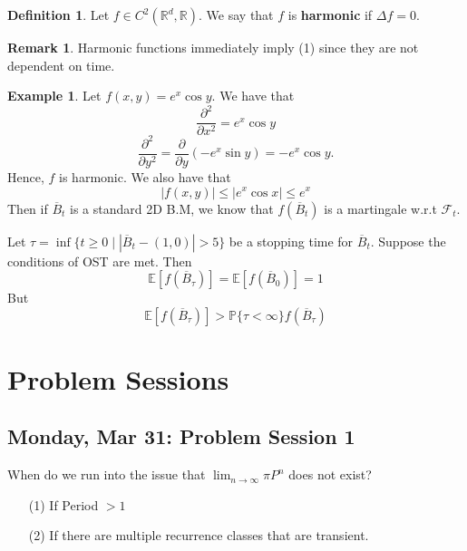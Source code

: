\documentclass[10pt, oneside]{article}
\newcommand{\bbR}{\mathbb{R}}
\newcommand{\bbP}{\mathbb{P}}
\newcommand{\bbE}{\mathbb{E}}
\theoremstyle{definition}
\newtheorem{exmp}{Example}[section]
\newtheorem{defn}{Definition}
\newtheorem{rem}{Remark}
\begin{document}
\begin{defn}
    Let $f\in C^2(\bbR^d, \bbR).$ We say that $f$ is \textbf{harmonic} if $\Delta f = 0.$ 
\end{defn}
\begin{rem}
    Harmonic functions immediately imply (1) since they are not dependent on time. 
\end{rem}

\begin{exmp}
    Let $f(x,y) = e^x \cos y.$ We have that 
    \[\frac{\partial ^2}{\partial x ^2} = e^x\cos y\]
    \[\frac{\partial ^2}{\partial y^2} = \frac{\partial}{\partial y}(-e^x\sin y) = -e^x\cos y.\] Hence, $f$ is harmonic. We also have that 
    \[|f(x, y)| \leq |e^x \cos x| \leq e^x\] Then if $\overline{B}_t$ is a standard 2D B.M, we know that $f(\overline{B}_t)$ is a martingale w.r.t $\mathcal{F}_t.$

    Let $\tau = \inf\{t \geq 0 \mid |\overline{B}_t - (1,0)| >5\}$ be a stopping time for $\overline{B}_t.$ Suppose the conditions of OST are met. Then 
    \[\bbE[f(\overline{B}_\tau)] = \bbE[f(\overline{B}_0)] = 1\] But 
    \[\bbE[f(\overline{B}_\tau)] >\bbP\{\tau < \infty \} f(\overline{B}_\tau)\]
\end{exmp}




\newpage
\section{Problem Sessions}
\subsection{Monday, Mar 31: Problem Session 1}
When do we run into the issue that $\lim_{n\to \infty}\pi P^n$ does not exist? 
\begin{enumerate}
    \item[(1)] If Period $> 1$
    \item[(2)] If there are multiple recurrence classes that are transient.
\end{enumerate}
\end{document}
